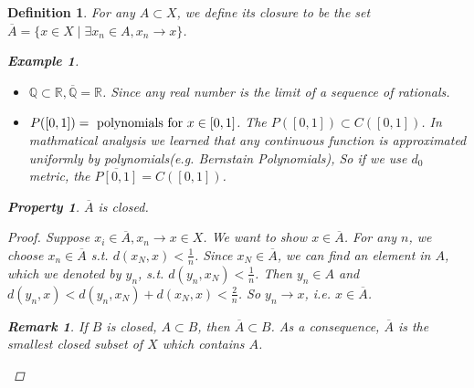 \documentclass{article}
\newtheorem*{property}{Property}
\newtheorem*{definition}{Definition}
\newtheorem*{remark}{Remark}
\newtheorem*{example}{Example}
\begin{document}
\begin{definition}
    For any $A \subset X$, we define its closure to be the set 
    $\overline{A} = \{x \in X \mid \exists x_n \in A, x_n \rightarrow x\}$.
    \begin{example} \hfill
        \begin{itemize}
            \item $\mathbb{Q} \subset \mathbb{R}, \overline{\mathbb{Q}} = \mathbb{R}$.
            Since any real number is the limit of a sequence of rationals.
            \item $P([0, 1]) = \textnormal{ polynomials for } x \in [0, 1]$.
            The $P([0, 1]) \subset C([0, 1])$.
            In mathmatical analysis we learned that any continuous function is approximated uniformly by polynomials(e.g. Bernstain Polynomials),
            So if we use $d_0$ metric, the $\overline{P[0, 1]}=C([0,1])$.
        \end{itemize}
    \end{example}
    \begin{property}
        $\overline{A}$ is closed.
        \begin{proof}
            Suppose $x_i \in \overline{A}, x_n \rightarrow x \in X$. We want to show $x \in \overline{A}$.
            For any $n$, we choose $x_n \in \overline{A}$ s.t. $d(x_N, x) < \frac{1}{n}$.
            Since $x_N \in \overline{A}$, we can find an element in $A$,
            which we denoted by $y_n$, s.t. $d(y_n, x_N) < \frac{1}{n}$.
            Then $y_n \in A$ and $d(y_n, x) < d(y_n, x_N) + d(x_N, x) < \frac{2}{n}$.
            So $y_n \rightarrow x$, i.e. $x \in \overline{A}$.
            \begin{remark}
                If $B$ is closed, $A \subset B$, then $\overline{A} \subset B$.
                As a consequence, $\overline{A}$ is the smallest closed subset of $X$ which contains $A$.
            \end{remark}
        \end{proof}
    \end{property}
\end{definition}
\end{document}

